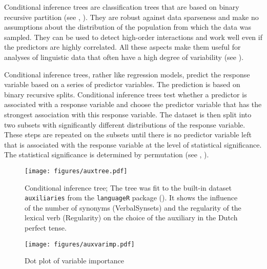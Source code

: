 Conditional inference trees are classification trees that are  based on binary recursive partition (see  \citealt{Hothorn2006}, \citealt{Strobl2009}). They are robust against data sparseness and  make no assumptions about the distribution of the population from which the data was sampled. They can be used to detect high-order interactions and work well even  if the predictors are highly correlated. All these aspects make them useful for analyses of linguistic data that often have a high degree of variability (see \citealt{Tagliamonte2012}). 

Conditional inference trees, rather like regression models,  predict the response variable based on a series of predictor variables. The prediction is based on binary recursive splits. Conditional inference trees test whether a predictor is associated with a response variable and choose the predictor variable that has the strongest association with this response variable.  The dataset is then split into two subsets  with significantly different distributions of the response variable.  These steps are repeated on the subsets until there is no predictor variable left that is associated with the response variable at the level of statistical significance. The statistical significance is determined by permutation (see \citealt{Tagliamonte2012}, \citealt{Levshina2015}).



\begin{figure}[p]
\texttt{[image: figures/auxtree.pdf]}
\caption{Conditional inference tree; \label{fig:auxtree}The tree was fit to the built-in dataset \texttt{auxiliaries}  from the \texttt{languageR} package (\citealt{Baayen2019}). It shows the influence of the number of synonyms (VerbalSynsets) and the regularity of the lexical verb (Regularity) on the choice of the auxiliary in the Dutch perfect tense.}  
\end{figure}

\begin{figure}[p]
\texttt{[image: figures/auxvarimp.pdf]}\caption{Dot plot of variable importance \label{fig:auxvarimp}}
\end{figure}

